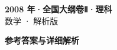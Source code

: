 \documentclass[zihao=-4, a4paper]{ctexart}
\begin{document}
\begin{center}
  {\Large\bfseries 2008 年·全国大纲卷Ⅱ·理科}\\[4pt]
  {\large 数学 · 解析版}
\end{center}
\medskip
{}

\clearpage
{}
\begin{center}{\Large\bfseries 参考答案与详细解析}\end{center}
\medskip

\end{document}
